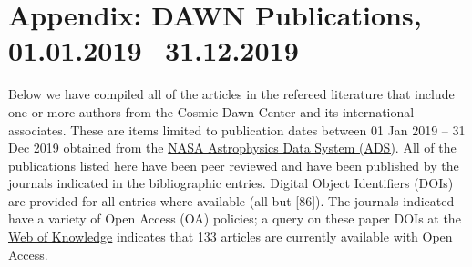 \documentclass{article}
\begin{document}
\newcommand\grl{\ref@jnl{Geophys.~Res.~Lett.}}%
\newcommand\jcp{\ref@jnl{JChPh}}%
\newcommand\jgr{\ref@jnl{J.~Geophys.~Res.}}%
\newcommand\jqsrt{\ref@jnl{JQSRT}}%
\newcommand\memsai{\ref@jnl{MmSAI}}%
\newcommand\nphysa{\ref@jnl{NuPhA}}%
\newcommand\physrep{\ref@jnl{PhR}}%
\newcommand\physscr{\ref@jnl{PhyS}}%
\newcommand\planss{\ref@jnl{Planet.~Space~Sci.}}%
\newcommand\procspie{\ref@jnl{Proc.~SPIE}}%

\newcommand\actaa{\ref@jnl{AcA}}%
\newcommand\caa{\ref@jnl{ChA\&A}}%
\newcommand\cjaa{\ref@jnl{ChJA\&A}}%
\newcommand\jcap{\ref@jnl{JCAP}}%
\newcommand\na{\ref@jnl{NewA}}%
\newcommand\nar{\ref@jnl{NewAR}}%
\newcommand\pasa{\ref@jnl{PASA}}%
\newcommand\rmxaa{\ref@jnl{RMxAA}}%

\newcommand\maps{\ref@jnl{M\&PS}}%
\newcommand\aas{\ref@jnl{AAS Meeting Abstracts}}%
\newcommand\dps{\ref@jnl{AAS/DPS Meeting Abstracts}}%

\newcommand\textrightarrow{$\rightarrow$}

\nocite{*}

\section*{Appendix: DAWN Publications, 01.01.2019\,--\,31.12.2019}

Below we have compiled all of the articles in the refereed literature that include one or more authors from the Cosmic Dawn Center and its international associates.  These are items limited to publication dates between 01 Jan 2019 -- 31 Dec 2019 obtained from the \href{https://ui.adsabs.harvard.edu/}{NASA Astrophysics Data System (ADS)}.  All of the publications listed here have been peer reviewed and have been published by the journals indicated in the bibliographic entries.  Digital Object Identifiers (DOIs) are provided for all entries where available (all but [86]).  The journals indicated have a variety of Open Access (OA) policies; a query on these paper DOIs at the  \href{http://apps.webofknowledge.com}{Web of Knowledge} indicates that 133 articles are currently available with Open Access.  
\end{document}
